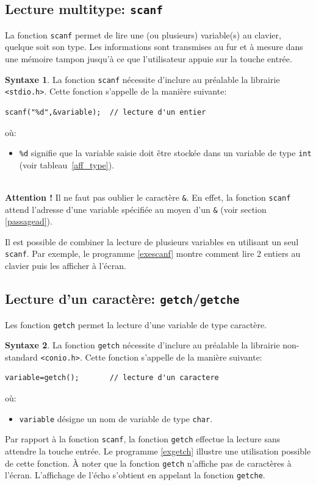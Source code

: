 \documentclass[a4paper,11pt]{book}
\newenvironment{warning} 
   {~\\ \textbf{Attention !}}{\\}
\theoremstyle{definition}
\newtheorem*{syntaxe}{Syntaxe}
\begin{document}
\subsection{Lecture multitype: \texttt{scanf}}
 La fonction \texttt{scanf} permet de lire une (ou
plusieurs) variable(s) au clavier, quelque soit son type. Les informations sont
transmises au fur et à mesure dans une mémoire tampon jusqu'à ce que l'utilisateur
appuie sur la touche entrée.
\begin{syntaxe}La fonction \texttt{scanf} nécessite d'inclure au préalable la librairie
\texttt{<stdio.h>}. Cette fonction s'appelle de la manière
suivante:
\begin{lstlisting}
scanf("%d",&variable);  // lecture d'un entier
\end{lstlisting}
où:
\begin{itemize}
\item \texttt{\%d} signifie que la variable saisie doit être stockée dans un variable de type \texttt{int} (voir tableau~\ref{aff_type}).
\end{itemize}
\end{syntaxe}
\begin{warning}
Il ne faut pas oublier le caractère \texttt{\&}. En effet, la fonction \texttt{scanf} attend l'adresse d'une variable spécifiée au moyen d'un \texttt{\&} (voir section \ref{passagead}).
\end{warning}

Il est possible de combiner la lecture de plusieurs variables en utilisant un seul
\texttt{scanf}. Par exemple, le programme \ref{exescanf} montre
comment lire 2 entiers au clavier puis les afficher à l'écran.



\subsection{Lecture d'un caractère: \texttt{getch}/\texttt{getche}}
 Les fonction \texttt{getch} permet la
lecture d'une variable de type caractère.
\begin{syntaxe}La fonction \texttt{getch} nécessite d'inclure au préalable la librairie non-standard \texttt{<conio.h>}. Cette fonction s'appelle de la manière suivante:
\begin{lstlisting}
variable=getch();       // lecture d'un caractere
\end{lstlisting}
où:
\begin{itemize}
\item \texttt{variable} désigne un nom de variable de type \texttt{char}.
\end{itemize}
\end{syntaxe}
Par rapport à la fonction \texttt{scanf}, la fonction \texttt{getch} effectue la lecture sans attendre la touche entrée. Le programme \ref{exgetch} illustre une utilisation possible de cette fonction. \`A noter que la fonction \texttt{getch} n'affiche pas de caractères à l'écran. L'affichage de l'écho s'obtient en appelant la fonction \texttt{getche}.
\end{document}
